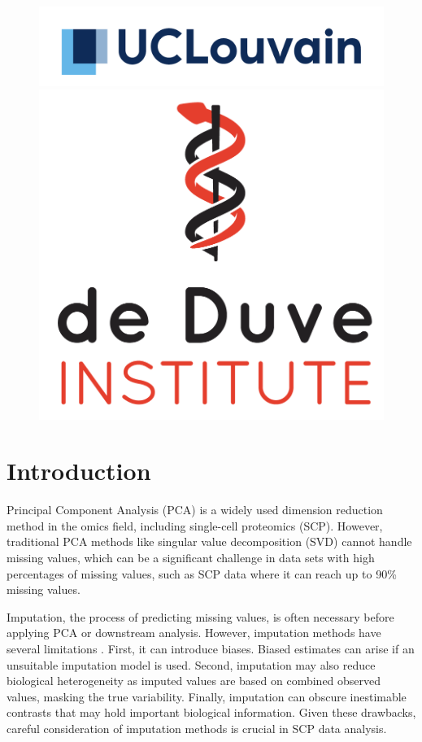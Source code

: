 \documentclass[a4paper, 11pt, twocolumn]{article}
\begin{document}
\begin{figure}[H]
          \begin{minipage}{.5\textwidth}
                \centering
                \includegraphics[width = \linewidth]{UCLouvain_Logo_Pos_CMJN.pdf}
          \end{minipage}
           \begin{minipage}{.5\textwidth}
           \centering
                \includegraphics[width = 0.7\linewidth]{institut.png}
          \end{minipage}
\end{figure}

\twocolumn
\section{Introduction}

Principal Component Analysis (PCA) is a widely used dimension reduction method in the omics field, including single-cell proteomics (SCP). However, traditional PCA methods like singular value decomposition (SVD) cannot handle missing values, which can be a significant challenge in data sets with high percentages of missing values, such as SCP data where it can reach up to 90\% missing values.

Imputation, the process of predicting missing values, is often necessary before applying PCA or downstream analysis. However, imputation methods have several limitations \citep{vanderaa_revisiting_2023}. First, it can introduce biases. Biased estimates can arise if an unsuitable imputation model is used. Second, imputation may also reduce biological heterogeneity as imputed values are based on combined observed values, masking the true variability. Finally, imputation can obscure inestimable contrasts that may hold important biological information.
Given these drawbacks, careful consideration of imputation methods is crucial in SCP data analysis.
\end{document}
